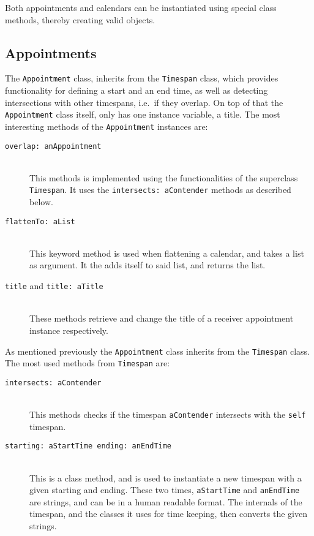 Both appointments and calendars can be instantiated using special class methods, thereby creating valid objects.

\subsection{Appointments}
The \texttt{Appointment} class, inherits from the \texttt{Timespan} class, which provides functionality for defining a start and an end time, as well as detecting intersections with other timespans, i.e.~if they overlap.
On top of that the \texttt{Appointment} class itself, only has one instance variable, a title.
The most interesting methods of the \texttt{Appointment} instances are:
\begin{description}
    \item[\texttt{overlap: anAppointment}]\hfill\\
        This methods is implemented using the functionalities of the superclass \texttt{Timespan}.
        It uses the \texttt{intersects: aContender} methods as described below.
    \item[\texttt{flattenTo: aList}]\hfill\\
        This keyword method is used when flattening a calendar, and takes a list as argument.
        It the adds itself to said list, and returns the list.
    \item[\texttt{title} and \texttt{title: aTitle}]\hfill\\
        These methods retrieve and change the title of a receiver appointment instance respectively.
\end{description}

As mentioned previously the \texttt{Appointment} class inherits from the \texttt{Timespan} class.
The most used methods from \texttt{Timespan} are:
\begin{description}
    \item[\texttt{intersects: aContender}]\hfill\\
        This methods checks if the timespan \texttt{aContender} intersects with the \texttt{self} timespan.
    \item[\texttt{starting: aStartTime ending: anEndTime}]\hfill\\
        This is a class method, and is used to instantiate a new timespan with a given starting and ending.
        These two times, \texttt{aStartTime} and \texttt{anEndTime} are strings, and can be in a human readable format.
        The internals of the timespan, and the classes it uses for time keeping, then converts the given strings.
\end{description}

